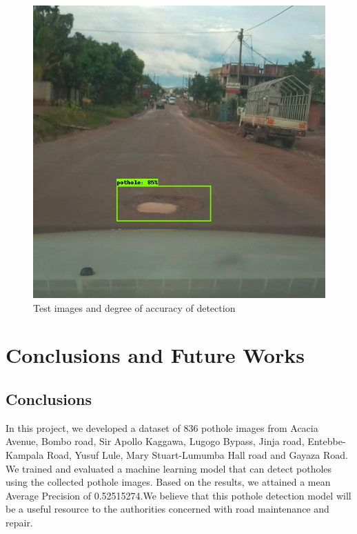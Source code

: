 \documentclass[12pt]{report}
\begin{document}
\begin{figure}[H]\includegraphics[scale=0.6]{6.jpg}\centering\caption{Test images and degree of accuracy of detection} \label{fig:Test Images} \end{figure}%
\chapter{Conclusions and Future Works}

\section{Conclusions}

In this project, we developed a dataset of 836 pothole images from Acacia Avenue, Bombo road, Sir Apollo Kaggawa, Lugogo Bypass, Jinja road, Entebbe-Kampala Road, Yusuf Lule, Mary Stuart-Lumumba Hall road and Gayaza Road.
We trained and evaluated a machine learning model that can detect potholes using the collected pothole images. Based on the results, we attained a mean Average Precision of 0.52515274.We believe that this pothole detection model will be a useful resource to the authorities concerned with road maintenance and repair.
\end{document}

